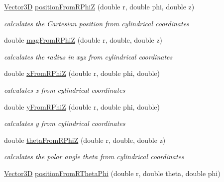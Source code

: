 \begin{DoxyCompactItemize}
\hyperlink{struct_d_d4hep_1_1_d_d_segmentation_1_1_vector3_d}{Vector3D} \hyperlink{namespace_d_d4hep_1_1_d_d_segmentation_1_1_util_a26afeef0487b44d0d1c634f43e1de11a}{positionFromRPhiZ} (double r, double phi, double z)
\begin{DoxyCompactList}\small\item\em calculates the Cartesian position from cylindrical coordinates \item\end{DoxyCompactList}\item 
double \hyperlink{namespace_d_d4hep_1_1_d_d_segmentation_1_1_util_aa316184b02cf82f628558fc2f543d973}{magFromRPhiZ} (double r, double, double z)
\begin{DoxyCompactList}\small\item\em calculates the radius in xyz from cylindrical coordinates \item\end{DoxyCompactList}\item 
double \hyperlink{namespace_d_d4hep_1_1_d_d_segmentation_1_1_util_aef69bb74835c52ef738740d16db3343e}{xFromRPhiZ} (double r, double phi, double)
\begin{DoxyCompactList}\small\item\em calculates x from cylindrical coordinates \item\end{DoxyCompactList}\item 
double \hyperlink{namespace_d_d4hep_1_1_d_d_segmentation_1_1_util_a7c2700f5933a62c0f9f2977adfbf6deb}{yFromRPhiZ} (double r, double phi, double)
\begin{DoxyCompactList}\small\item\em calculates y from cylindrical coordinates \item\end{DoxyCompactList}\item 
double \hyperlink{namespace_d_d4hep_1_1_d_d_segmentation_1_1_util_a810a2371a6bb37d88321f100026f35c3}{thetaFromRPhiZ} (double r, double, double z)
\begin{DoxyCompactList}\small\item\em calculates the polar angle theta from cylindrical coordinates \item\end{DoxyCompactList}\item 
\hyperlink{struct_d_d4hep_1_1_d_d_segmentation_1_1_vector3_d}{Vector3D} \hyperlink{namespace_d_d4hep_1_1_d_d_segmentation_1_1_util_a9da66f5c45a3396609860916f296ae0c}{positionFromRThetaPhi} (double r, double theta, double phi)

\end{DoxyCompactItemize}

